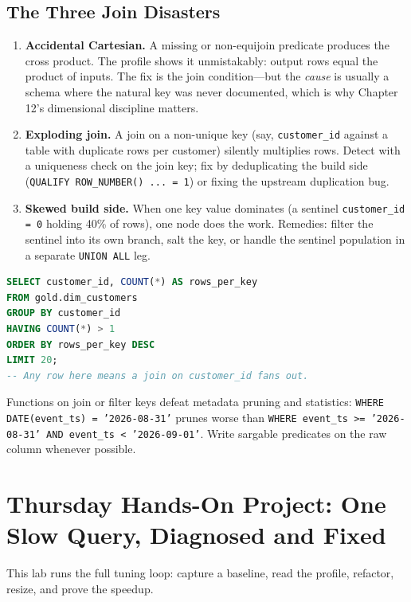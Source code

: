\subsection{The Three Join Disasters}
\begin{enumerate}
    \item \textbf{Accidental Cartesian.} A missing or non-equijoin predicate produces the cross product. The profile shows it unmistakably: output rows equal the product of inputs. The fix is the join condition---but the \emph{cause} is usually a schema where the natural key was never documented, which is why Chapter 12's dimensional discipline matters.
    \item \textbf{Exploding join.} A join on a non-unique key (say, \texttt{customer\_id} against a table with duplicate rows per customer) silently multiplies rows. Detect with a uniqueness check on the join key; fix by deduplicating the build side (\texttt{QUALIFY ROW\_NUMBER() ... = 1}) or fixing the upstream duplication bug.
    \item \textbf{Skewed build side.} When one key value dominates (a sentinel \texttt{customer\_id = 0} holding 40\% of rows), one node does the work. Remedies: filter the sentinel into its own branch, salt the key, or handle the sentinel population in a separate \texttt{UNION ALL} leg.
\end{enumerate}

\begin{lstlisting}[language=SQL, caption={Detecting a non-unique join key before it explodes}]
SELECT customer_id, COUNT(*) AS rows_per_key
FROM gold.dim_customers
GROUP BY customer_id
HAVING COUNT(*) > 1
ORDER BY rows_per_key DESC
LIMIT 20;
-- Any row here means a join on customer_id fans out.
\end{lstlisting}

\begin{tipbox}
Functions on join or filter keys defeat metadata pruning and statistics: \texttt{WHERE DATE(event\_ts) = '2026-08-31'} prunes worse than \texttt{WHERE event\_ts >= '2026-08-31' AND event\_ts < '2026-09-01'}. Write sargable predicates on the raw column whenever possible.
\end{tipbox}

\section{Thursday Hands-On Project: One Slow Query, Diagnosed and Fixed}
This lab runs the full tuning loop: capture a baseline, read the profile, refactor, resize, and prove the speedup.

